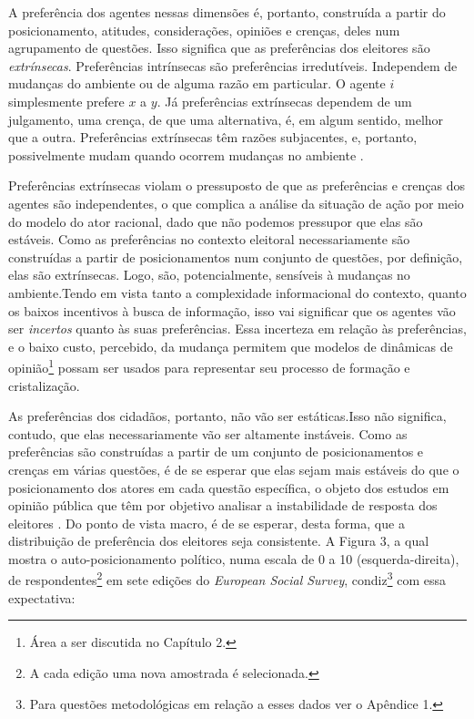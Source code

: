 A preferência dos agentes nessas dimensões é, portanto, construída a partir do
posicionamento, atitudes, considerações, opiniões e crenças, deles num
agrupamento de questões. Isso significa que as preferências dos eleitores são
\textit{extrínsecas}. Preferências intrínsecas são preferências irredutíveis.
Independem de mudanças do ambiente ou de alguma razão em particular. O agente
\(i\) simplesmente prefere \(x\) a \(y\). Já preferências extrínsecas dependem
de um julgamento, uma crença, de que uma alternativa, é, em algum sentido, melhor
que a outra. Preferências extrínsecas têm razões subjacentes, e, portanto,
possivelmente mudam quando ocorrem mudanças no ambiente \cite{liu2010wright,
  binmore2008rational}.

Preferências extrínsecas violam o pressuposto de que as preferências e crenças
dos agentes são independentes, o que complica a análise da situação de ação por
meio do modelo do ator racional, dado que não podemos pressupor que elas são
estáveis. Como as preferências no contexto eleitoral necessariamente são
construídas a partir de posicionamentos num conjunto de questões, por definição,
elas são extrínsecas. Logo, são, potencialmente, sensíveis à mudanças no
ambiente.Tendo em vista tanto a complexidade informacional do contexto, quanto
os baixos incentivos à busca de informação, isso vai significar que os agentes
vão ser \textit{incertos} quanto às suas preferências. Essa incerteza em relação
às preferências, e o baixo custo, percebido, da mudança permitem que modelos de
dinâmicas de opinião\footnote{Área a ser discutida no Capítulo 2.} possam ser
usados para representar seu processo de formação e cristalização.


As preferências dos cidadãos, portanto, não vão ser estáticas.Isso não
significa, contudo, que elas necessariamente vão ser altamente instáveis. Como
as preferências são construídas a partir de um conjunto de posicionamentos e
crenças em várias questões, é de se esperar que elas sejam mais estáveis do que
o posicionamento dos atores em cada questão específica, o objeto dos estudos em
opinião pública que têm por objetivo analisar a instabilidade de resposta dos
eleitores \cite{druckman2012public}. Do ponto de vista macro, é de se esperar,
desta forma, que a distribuição de preferência dos eleitores seja consistente. A
Figura 3, a qual mostra o auto-posicionamento político, numa escala de 0 a 10
(esquerda-direita), de respondentes\footnote{A cada edição uma nova amostrada é
  selecionada.} em sete edições do \textit{European Social Survey},
condiz\footnote{Para questões metodológicas em relação a esses dados ver o
  Apêndice 1.} com essa expectativa:


